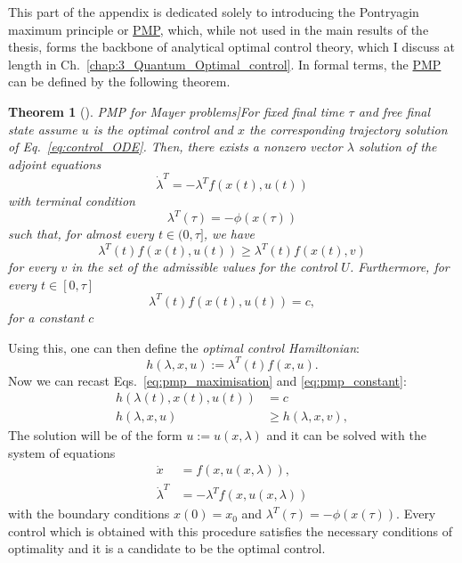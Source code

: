 \documentclass[a4paper,oneside,11pt]{book}
\newcommand{\dotlambda}{\dot{\lambda}}
\newcommand{\acrref}[1]{\hyperref[acr:#1]{#1}}
\begin{document}
This part of the appendix is dedicated solely to introducing the Pontryagin maximum principle or \acrref{PMP}, which, while not used in the main results of the thesis, forms the backbone of analytical optimal control theory, which I discuss at length in Ch.~\ref{chap:3_Quantum_Optimal_control}. In formal terms, the \acrref{PMP} can be defined \cite{dalessandro_introduction_2021} by the following theorem.

\newtheorem{theorem}{Theorem}

\begin{theorem}[\acrref{PMP} for Mayer problems]\label{thm:pmp}
    For fixed final time $\tau$ and free final state assume $u$ is the optimal control and $x$ the corresponding trajectory solution of Eq.~\eqref{eq:control_ODE}. Then, there exists a nonzero vector $\lambda$ solution of the adjoint equations
  \begin{equation}
      \dotlambda^T = - \lambda^T f(x(t), u(t))
  \end{equation}
  with terminal condition
  \begin{equation}
      \lambda^T(\tau) = -\phi(x(\tau))
  \end{equation}
  such that, for almost every $t \in (0, \tau]$, we have
  \begin{equation}\label{eq:pmp_maximisation}
      \lambda^T(t) f(x(t), u(t)) \geq \lambda^T(t) f(x(t), v)
  \end{equation}
  for every $v$ in the set of the admissible values for the control $U$. Furthermore, for every $t \in [0, \tau]$
  \begin{equation}\label{eq:pmp_constant}
      \lambda^T(t) f(x(t), u(t)) = c,
  \end{equation}
  for a constant $c$
\end{theorem}

Using this, one can then define the \emph{optimal control Hamiltonian}:
\begin{equation}
    h(\lambda, x, u) := \lambda^T(t) f(x, u).
\end{equation}
Now we can recast Eqs.~\eqref{eq:pmp_maximisation} and \eqref{eq:pmp_constant}:
\begin{equation}
    \begin{aligned}
        h(\lambda(t), x(t), u(t)) &= c \\
        h(\lambda, x, u) &\geq h(\lambda, x, v),
    \end{aligned}
\end{equation}
The solution will be of the form $u := u(x, \lambda)$ and it can be solved with the system of equations
\begin{equation}
    \begin{aligned}
        \dot{x} &= f(x, u(x, \lambda)), \\
        \dotlambda^T &= -\lambda^T f(x, u(x, \lambda))
    \end{aligned}
\end{equation}
with the boundary conditions $x(0) = x_0$ and $\lambda^T(\tau) = -\phi(x(\tau))$. Every control which is obtained with this procedure satisfies the necessary conditions of optimality and it is a candidate to be the optimal control.
\end{document}

